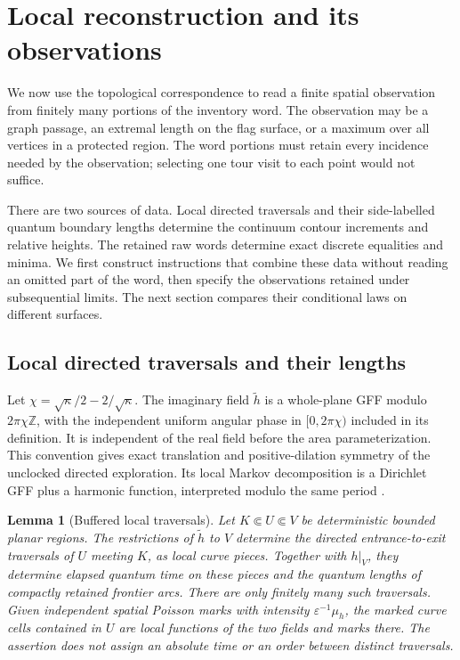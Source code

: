 \documentclass[11pt]{article}
\numberwithin{equation}{section}
\newtheorem{lemma}[theorem]{Lemma}
\theoremstyle{definition}
\theoremstyle{remark}
\newcommand{\1}{\mathbf 1}
\begin{document}
\section{Local reconstruction and its observations}\label{local:section}

We now use the topological correspondence to read a finite spatial
observation from finitely many portions of the inventory word.  The
observation may be a graph passage, an extremal length on the flag
surface, or a maximum over all vertices in a protected region.  The
word portions must retain every incidence needed by the observation;
selecting one tour visit to each point would not suffice.

There are two sources of data.  Local directed traversals and their
side-labelled quantum boundary lengths determine the continuum contour
increments and relative heights.  The retained raw words determine
exact discrete equalities and minima.  We first construct instructions
that combine these data without reading an omitted part of the word,
then specify the observations retained under subsequential limits.
The next section compares their conditional laws on different surfaces.

\subsection{Local directed traversals and their lengths}

Let $\chi=\sqrt\kappa/2-2/\sqrt\kappa$.
The imaginary field $\widetilde h$ is a whole-plane GFF modulo
$2\pi\chi\mathbb Z$, with the independent uniform angular phase in
$[0,2\pi\chi)$ included in its definition.  It is independent of the real
field before the area parameterization.  This convention gives exact
translation and positive-dilation symmetry of the unclocked directed
exploration.  Its local Markov decomposition is a Dirichlet GFF plus a
harmonic function, interpreted modulo the same period
\cite[Section 2.2.1 and Propositions 2.8, 2.11]{MillerSheffieldIGIV}.

\begin{lemma}[Buffered local traversals]\label{enc:local-exploration}
Let $K\Subset U\Subset V$ be deterministic bounded planar regions.
The restrictions of $\widetilde h$ to $V$ determine the directed
entrance-to-exit traversals of $U$ meeting $K$, as local curve pieces.
Together with $h|_V$, they determine elapsed quantum time on these
pieces and the quantum lengths of compactly retained frontier arcs.
There are only finitely many such traversals.  Given independent spatial
Poisson marks with intensity $\varepsilon^{-1}\mu_h$, the marked curve
cells contained in $U$ are local functions of the two fields and marks
there.  The assertion does not assign an absolute time or an order between
distinct traversals.
\end{lemma}
\end{document}
